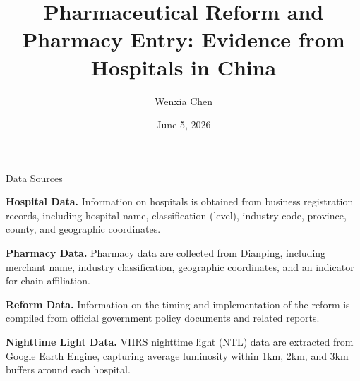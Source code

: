\documentclass{beamer}
\title{Pharmaceutical Reform and Pharmacy Entry: Evidence from Hospitals in China}
\author{Wenxia Chen}
\date{June 5, 2026}
\begin{document}
\frame{\titlepage}


\begin{frame}{Data Sources}

\textbf{Hospital Data.} Information on hospitals is obtained from business registration records, including hospital name, classification (level), industry code, province, county, and geographic coordinates.

\medskip

\textbf{Pharmacy Data.} Pharmacy data are collected from Dianping, including merchant name, industry classification, geographic coordinates, and an indicator for chain affiliation.

\medskip

\textbf{Reform Data.} Information on the timing and implementation of the reform is compiled from official government policy documents and related reports.

\medskip

\textbf{Nighttime Light Data.} VIIRS nighttime light (NTL) data are extracted from Google Earth Engine, capturing average luminosity within 1km, 2km, and 3km buffers around each hospital.

\end{frame}
\end{document}
